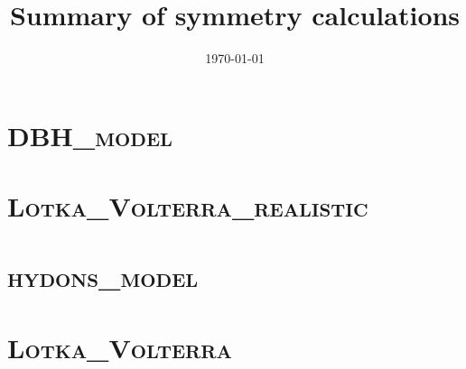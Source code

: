 \documentclass{book}
\begin{document}
\title{\textbf{Summary of symmetry calculations}}
\date{\today}
\maketitle
\tableofcontents
\clearpage
\chapter{\textsc{DBH\_model}}


\chapter{\textsc{Lotka\_Volterra\_realistic}}


\chapter{\textsc{hydons\_model}}


\chapter{\textsc{Lotka\_Volterra}}

\end{document}
